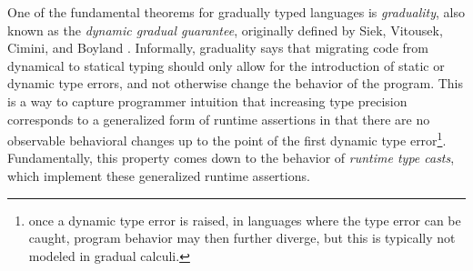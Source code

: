

One of the fundamental theorems for gradually typed languages is
\emph{graduality}, also known as the \emph{dynamic gradual guarantee},
originally defined by Siek, Vitousek, Cimini, and Boyland
\cite{siek_et_al:LIPIcs:2015:5031, new-ahmed2018}.
%
Informally, graduality says that migrating code from dynamical to
statical typing should only allow for the introduction of static or
dynamic type errors, and not otherwise change the behavior of the
program.
%
This is a way to capture programmer intuition that increasing type
precision corresponds to a generalized form of runtime assertions in
that there are no observable behavioral changes up to the point of the
first dynamic type error\footnote{once a dynamic type error is raised,
in languages where the type error can be caught, program behavior may
then further diverge, but this is typically not modeled in gradual
calculi.}.
%
Fundamentally, this property comes down to the behavior of
\emph{runtime type casts}, which implement these generalized runtime
assertions.

